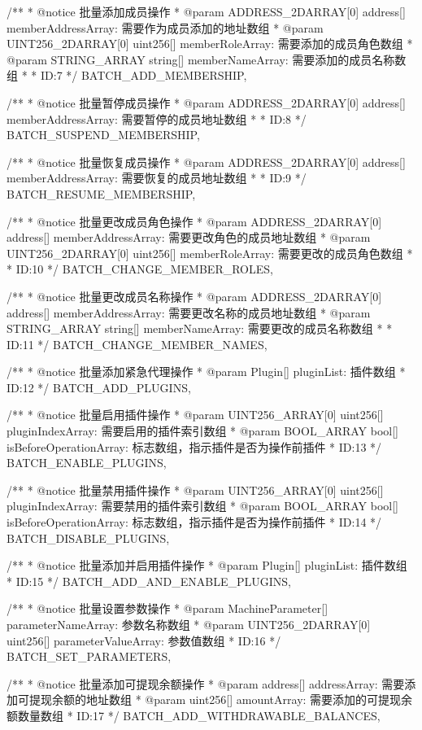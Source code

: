 \documentclass[main.tex]{subfiles}
\begin{document}
\begin{spverbatim}
  /**
   * @notice 批量添加成员操作
   * @param ADDRESS_2DARRAY[0] address[] memberAddressArray: 需要作为成员添加的地址数组
   * @param UINT256_2DARRAY[0] uint256[] memberRoleArray: 需要添加的成员角色数组
   * @param STRING_ARRAY string[] memberNameArray: 需要添加的成员名称数组
   * 
   * ID:7
   */
  BATCH_ADD_MEMBERSHIP,

  /**
   * @notice 批量暂停成员操作
   * @param ADDRESS_2DARRAY[0] address[] memberAddressArray: 需要暂停的成员地址数组
   * 
   * ID:8
   */
  BATCH_SUSPEND_MEMBERSHIP,

  /**
   * @notice 批量恢复成员操作
   * @param ADDRESS_2DARRAY[0] address[] memberAddressArray: 需要恢复的成员地址数组
   * 
   * ID:9
   */
  BATCH_RESUME_MEMBERSHIP,

  /**
   * @notice 批量更改成员角色操作
   * @param ADDRESS_2DARRAY[0] address[] memberAddressArray: 需要更改角色的成员地址数组
   * @param UINT256_2DARRAY[0] uint256[] memberRoleArray: 需要更改的成员角色数组
   * 
   * ID:10
   */
  BATCH_CHANGE_MEMBER_ROLES,

  /**
   * @notice 批量更改成员名称操作
   * @param ADDRESS_2DARRAY[0] address[] memberAddressArray: 需要更改名称的成员地址数组
   * @param STRING_ARRAY string[] memberNameArray: 需要更改的成员名称数组
   * 
   * ID:11
   */
  BATCH_CHANGE_MEMBER_NAMES,

  /**
   * @notice 批量添加紧急代理操作
   * @param Plugin[] pluginList: 插件数组
   * ID:12
   */
  BATCH_ADD_PLUGINS,

  /**
   * @notice 批量启用插件操作
   * @param UINT256_ARRAY[0] uint256[] pluginIndexArray: 需要启用的插件索引数组
   * @param BOOL_ARRAY bool[] isBeforeOperationArray: 标志数组，指示插件是否为操作前插件
   * ID:13
   */
  BATCH_ENABLE_PLUGINS,

  /**
   * @notice 批量禁用插件操作
   * @param UINT256_ARRAY[0] uint256[] pluginIndexArray: 需要禁用的插件索引数组
   * @param BOOL_ARRAY bool[] isBeforeOperationArray: 标志数组，指示插件是否为操作前插件
   * ID:14
   */
  BATCH_DISABLE_PLUGINS,

  /**
   * @notice 批量添加并启用插件操作
   * @param Plugin[] pluginList: 插件数组
   * ID:15
   */
  BATCH_ADD_AND_ENABLE_PLUGINS,

  /**
   * @notice 批量设置参数操作
   * @param MachineParameter[] parameterNameArray: 参数名称数组
   * @param UINT256_2DARRAY[0] uint256[] parameterValueArray: 参数值数组
   * ID:16
   */
  BATCH_SET_PARAMETERS,

  /**
   * @notice 批量添加可提现余额操作
   * @param address[] addressArray: 需要添加可提现余额的地址数组
   * @param uint256[] amountArray: 需要添加的可提现余额数量数组
   * ID:17
   */
  BATCH_ADD_WITHDRAWABLE_BALANCES,


\end{spverbatim}
\end{document}
